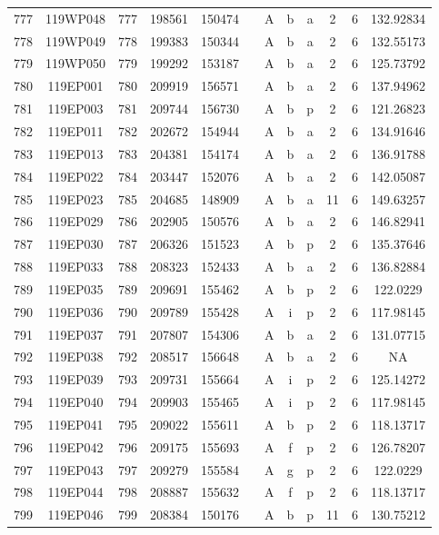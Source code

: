\begin{tabular}{|*{12}{c|}}
777 & 119WP048 & 777 & 198561 & 150474 &  & A & b & a & 2 & 6 & 132.92834 \\ 
778 & 119WP049 & 778 & 199383 & 150344 &  & A & b & a & 2 & 6 & 132.55173 \\ 
779 & 119WP050 & 779 & 199292 & 153187 &  & A & b & a & 2 & 6 & 125.73792 \\ 
780 & 119EP001 & 780 & 209919 & 156571 &  & A & b & a & 2 & 6 & 137.94962 \\ 
781 & 119EP003 & 781 & 209744 & 156730 &  & A & b & p & 2 & 6 & 121.26823 \\ 
782 & 119EP011 & 782 & 202672 & 154944 &  & A & b & a & 2 & 6 & 134.91646 \\ 
783 & 119EP013 & 783 & 204381 & 154174 &  & A & b & a & 2 & 6 & 136.91788 \\ 
784 & 119EP022 & 784 & 203447 & 152076 &  & A & b & a & 2 & 6 & 142.05087 \\ 
785 & 119EP023 & 785 & 204685 & 148909 &  & A & b & a & 11 & 6 & 149.63257 \\ 
786 & 119EP029 & 786 & 202905 & 150576 &  & A & b & a & 2 & 6 & 146.82941 \\ 
787 & 119EP030 & 787 & 206326 & 151523 &  & A & b & p & 2 & 6 & 135.37646 \\ 
788 & 119EP033 & 788 & 208323 & 152433 &  & A & b & a & 2 & 6 & 136.82884 \\ 
789 & 119EP035 & 789 & 209691 & 155462 &  & A & b & p & 2 & 6 & 122.0229 \\ 
790 & 119EP036 & 790 & 209789 & 155428 &  & A & i & p & 2 & 6 & 117.98145 \\ 
791 & 119EP037 & 791 & 207807 & 154306 &  & A & b & a & 2 & 6 & 131.07715 \\ 
792 & 119EP038 & 792 & 208517 & 156648 &  & A & b & a & 2 & 6 & NA \\ 
793 & 119EP039 & 793 & 209731 & 155664 &  & A & i & p & 2 & 6 & 125.14272 \\ 
794 & 119EP040 & 794 & 209903 & 155465 &  & A & i & p & 2 & 6 & 117.98145 \\ 
795 & 119EP041 & 795 & 209022 & 155611 &  & A & b & p & 2 & 6 & 118.13717 \\ 
796 & 119EP042 & 796 & 209175 & 155693 &  & A & f & p & 2 & 6 & 126.78207 \\ 
797 & 119EP043 & 797 & 209279 & 155584 &  & A & g & p & 2 & 6 & 122.0229 \\ 
798 & 119EP044 & 798 & 208887 & 155632 &  & A & f & p & 2 & 6 & 118.13717 \\ 
799 & 119EP046 & 799 & 208384 & 150176 &  & A & b & p & 11 & 6 & 130.75212 \\ 

\end{tabular}
